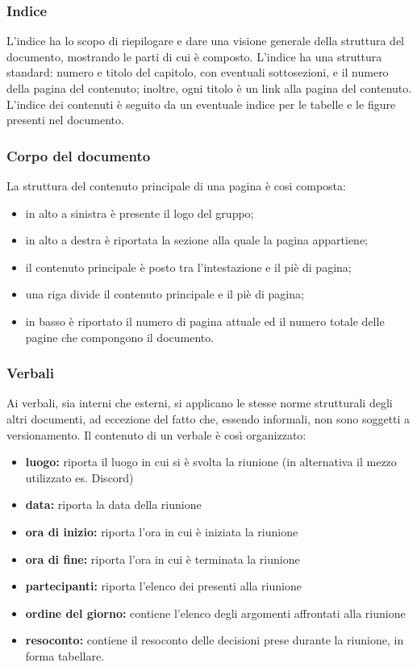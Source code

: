 \subsubsection{Indice}\label{3.1.7.3}
L'indice ha lo scopo di riepilogare e dare una visione generale della struttura del documento, mostrando le parti di cui è composto. L'indice ha una struttura standard: numero e titolo del capitolo, con eventuali sottosezioni, e il numero della pagina del contenuto; inoltre, ogni titolo è un link alla pagina del contenuto. L'indice dei contenuti è seguito da un eventuale indice per le tabelle e le figure presenti nel documento.
\subsubsection{Corpo del documento}\label{3.1.7.4}
La struttura del contenuto principale di una pagina è cosi composta:
\begin{itemize}
\item in alto a sinistra è presente il logo del gruppo;
	\item in alto a destra è riportata la sezione alla quale la pagina appartiene;
		\item il contenuto principale è posto tra l'intestazione e il piè di pagina;
			\item una riga divide il contenuto principale e il piè di pagina;
				\item in basso è riportato il numero di pagina attuale ed il numero totale delle pagine che compongono il documento.
\end{itemize}
\subsubsection{Verbali}\label{3.1.7.5}
Ai verbali, sia interni che esterni, si applicano le stesse norme strutturali degli altri documenti, ad eccezione del fatto che, essendo informali, non sono soggetti a versionamento. Il contenuto di un verbale è così organizzato:
\begin{itemize}
\item \textbf{luogo:} riporta il luogo in cui si è svolta la riunione (in alternativa il mezzo utilizzato es. Discord)
	\item \textbf{data:} riporta la data della riunione
		\item \textbf{ora di inizio:} riporta l'ora in cui è iniziata la riunione
			\item \textbf{ora di fine:} riporta l'ora in cui è terminata la riunione
				\item \textbf{partecipanti:} riporta l'elenco dei presenti alla riunione
					\item \textbf{ordine del giorno:} contiene l'elenco degli argomenti affrontati alla riunione
						\item \textbf{resoconto:}  contiene il resoconto delle decisioni prese durante la riunione, in forma tabellare.
\end{itemize}
